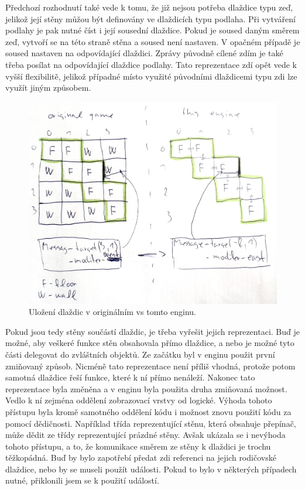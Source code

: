 Předchozí rozhodnutí také vede k tomu, že již nejsou potřeba dlaždice typu zeď, jelikož její stěny můžou být definovány ve 
dlaždicích typu podlaha. Při vytváření podlahy je pak nutné číst i její sousední dlaždice. Pokud je soused daným směrem zeď, 
vytvoří se na této straně stěna a soused není nastaven. V opačném případě je soused nastaven na odpovídající dlaždici.
Zprávy původně cílené zdím je také třeba posílat na odpovídající dlaždice podlahy. Tato reprezentace zdí opět vede k
vyšší flexibilitě, jelikož případné místo využité původními dlaždicemi typu zdi lze využít jiným způsobem.

\begin{figure}[H]\centering
\includegraphics[width=\textwidth]{./img/tile-representation.png}
\caption{Uložení dlaždic v originálním vs tomto enginu.}
\label{tile-representation-img}
\end{figure}

Pokud jsou tedy stěny součástí dlaždic, je třeba vyřešit jejich reprezentaci. Buď je možné, aby veškeré funkce stěn obsahovala přímo
dlaždice, a nebo je možné tyto části delegovat do zvláštních objektů. Ze začátku byl v enginu použit první zmiňovaný způsob. Nicméně 
tato reprezentace není příliš vhodná, protože potom samotná dlaždice řeší funkce, které k ní přímo nenáleží.
Nakonec tato reprezentace byla změněna a v enginu byla použita druha zmiňovaná možnost. Vedlo k ní zejména oddělení zobrazovací vrstvy 
od logické. Výhoda tohoto přístupu byla kromě samotného oddělení kódu i možnost znovu použití kódu za pomocí dědičnosti. 
Například třída reprezentující stěnu, která obsahuje přepínač, může dědit ze třídy reprezentující prázdné stěny. 
Avšak ukázala se i nevýhoda tohoto přístupu, a to, že komunikace směrem ze stěny k dlaždici je trochu těžkopádná.
Buď by bylo zapotřebí předat zdi referenci na jejich rodičovské dlaždice, nebo by se museli
použít události. Pokud to bylo v některých případech nutné, přiklonili jsem se k použití událostí.

